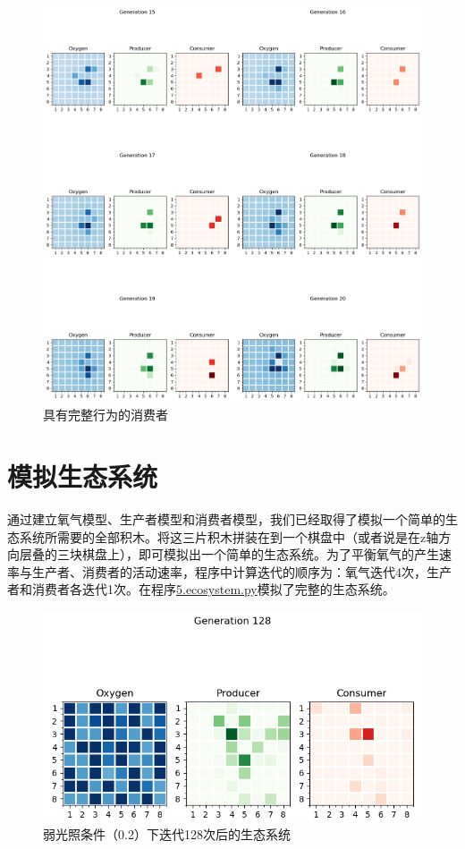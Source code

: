 \documentclass{ctexart}
\begin{document}
\begin{figure}[ht]
  \centering
  \includegraphics[width=\textwidth]{consumer.png}
  \caption{具有完整行为的消费者}
  \label{fig:consumer}
\end{figure}

\section{模拟生态系统}

通过建立氧气模型、生产者模型和消费者模型，我们已经取得了模拟一个简单的生态系统所需要的全部积木。将这三片积木拼装在到一个棋盘中（或者说是在z轴方向层叠的三块棋盘上），即可模拟出一个简单的生态系统。为了平衡氧气的产生速率与生产者、消费者的活动速率，程序中计算迭代的顺序为：氧气迭代4次，生产者和消费者各迭代1次。在程序\underline{5.ecosystem.py}模拟了完整的生态系统。

\begin{figure}[ht]
  \centering
  \includegraphics[scale=0.75]{weak-light.png}
  \caption{弱光照条件（0.2）下迭代128次后的生态系统}
  \label{fig:weak-light}
\end{figure}
\end{document}
